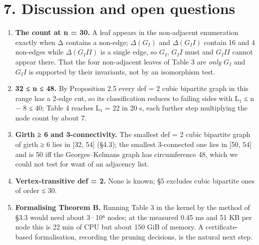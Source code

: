 \documentclass[11pt,a4paper]{article}
\theoremstyle{named}
\begin{document}
\section*{7. Discussion and open questions}
\begin{enumerate}
\item[1.] \textbf{The count at n = 30.} A leaf appears in the non-adjacent enumeration exactly when Δ contains a non-edge; $Δ(G_I)$ and $Δ(G_II)$ contain 16 and 4 non-edges while $Δ(G_III)$ is a single edge, so $G_I$, $G_II$ must and $G_III$ cannot appear there. That the four non-adjacent leaves of Table 3 are \textit{only} $G_I$ and $G_II$ is supported by their invariants, not by an isomorphism test.
\item[2.] \textbf{32 ≤ n ≤ 48.} By Proposition 2.5 every def = 2 cubic bipartite graph in this range has a 2-edge cut, so its classification reduces to failing sides with L₁ ≤ n − 8 ≤ 40; Table 4 reaches L₁ = 22 in 20 s, each further step multiplying the node count by about 7.
\item[3.] \textbf{Girth ≥ 6 and 3-connectivity.} The smallest def = 2 cubic bipartite graph of girth ≥ 6 lies in [32, 54] (§4.3); the smallest 3-connected one lies in [50, 54] and is 50 iff the Georges–Kelmans graph has circumference 48, which we could not test for want of an adjacency list.
\item[4.] \textbf{Vertex-transitive def = 2.} None is known; §5 excludes cubic bipartite ones of order ≤ 30.
\item[5.] \textbf{Formalising Theorem B.} Running Table 3 in the kernel by the method of §3.3 would need about 3·10⁶ nodes; at the measured 0.45 ms and 51 KB per node this is 22 min of CPU but about 150 GiB of memory. A certificate-based formalisation, recording the pruning decisions, is the natural next step.
\end{enumerate}
\end{document}
